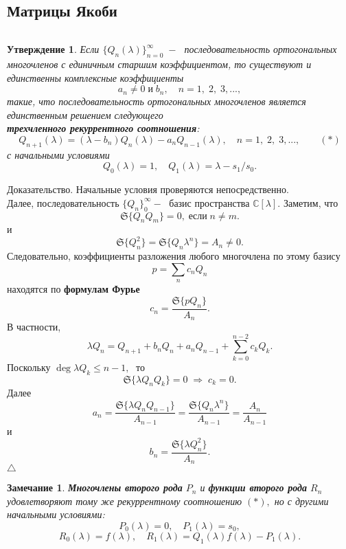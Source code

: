 \documentclass[12 pt, a4 paper]{article}
\theoremstyle{plain}   \newtheorem{Pro}{Задача}
\newtheorem{Sta}{Утверждение}
\newtheorem{Rem}{Замечание}
\begin{document}
\subsection{Матрицы Якоби}
$ \; $
\\

\begin{Sta}
Если
$ \{ Q_n (\lambda ) \} _{n=0}^{\infty} \; - \; $
последовательность ортогональных многочленов с единичным
старшим коэффициентом, то существуют и единственны
комплексные коэффициенты
$$
  a_n \not = 0  \; и \; b_n ,
  \quad n=1, \; 2, \; 3,...,
$$
такие, что последовательность ортогональных многочленов
является единственным решением следующего\\
{\bfseries трехчленного рекуррентного соотношения}:
$$
  Q_{n+1}(\lambda )=
  (\lambda -b_n )Q_n (\lambda )-
  a_n Q_{n-1}(\lambda ),
  \quad n=1, \; 2, \; 3,...,
  \qquad (\ast )
$$
с начальными условиями
$$
  Q_0 (\lambda )=1, \quad
  Q_1 (\lambda )=\lambda - s_1 /s_0 .
$$
\end{Sta}
{\Large Доказательство.}
Начальные условия проверяются непосредственно.\\
Далее, последовательность
$ \{ Q_n \}_0 ^{\infty} - \; $
базис пространства
$ \mathbb{C}[\lambda ]. $
Заметим, что
$$
  \mathfrak{S} \{ Q_n Q_m \} =0, \; если \; n \not = m .
$$
и
$$
  \mathfrak{S} \{ Q_n ^2 \} =
  \mathfrak{S} \{ Q_n \lambda ^n \} =
  A_n \not =0.
$$
Следовательно, коэффициенты разложения любого многочлена по
этому базису
$$
  p=\sum _n c_n Q_n
$$
находятся по
{\bfseries формулам Фурье}
$$
  c_n = \frac{\mathfrak{S} \{ pQ_n \} }
  {A_n }.
$$
В частности,
$$
  \lambda Q_n =Q_{n+1}+b_n Q_n +a_n Q_{n-1}+
  \sum _{k=0}^{n-2} c_k Q_k .
$$
Поскольку
$ \deg \lambda Q_k \leq n-1, \; $
то
$$
  \mathfrak{S} \{ \lambda Q_n Q_k \} =0 \;
  \Rightarrow \; c_k =0.
$$
Далее
$$
  a_n =\frac{\mathfrak{S} \{ \lambda Q_n Q_{n-1} \} }
  {A_{n-1}} =
  \frac{\mathfrak{S} \{ Q_n \lambda ^n \} }{A_{n-1}}=
  \frac{A_n }{A_{n-1}}
$$
и
$$
  b_n =\frac{\mathfrak{S} \{ \lambda Q_n ^2 \} }
  {A_n }.
$$
$ \triangle $
\begin{Rem}
{\bfseries Многочлены второго рода}
$ P_n $
и
{\bfseries функции второго рода}
$ R_n $
удовлетворяют тому же рекуррентному соотношению
$ (\ast ) , $
но с другими начальными условиями:
$$
  P_0 (\lambda )=0, \quad
  P_1 (\lambda )=s_0 ,
$$
$$
  R_0 (\lambda )=f( \lambda ), \quad
  R_1 (\lambda )=Q_1 (\lambda )f(\lambda )-P_1 (\lambda ).
$$
\end{Rem}
$ \; $
\\
\end{document}
